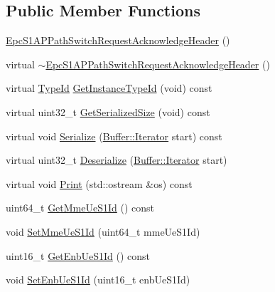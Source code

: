 \subsection*{Public Member Functions}
\begin{DoxyCompactItemize}
\item 
\hyperlink{classns3_1_1EpcS1APPathSwitchRequestAcknowledgeHeader_af9095af10fab4dd9b2f0b58a494218a7}{Epc\+S1\+A\+P\+Path\+Switch\+Request\+Acknowledge\+Header} ()
\item 
virtual \hyperlink{classns3_1_1EpcS1APPathSwitchRequestAcknowledgeHeader_a999083980082e33c430c78870f640fc5}{$\sim$\+Epc\+S1\+A\+P\+Path\+Switch\+Request\+Acknowledge\+Header} ()
\item 
virtual \hyperlink{classns3_1_1TypeId}{Type\+Id} \hyperlink{classns3_1_1EpcS1APPathSwitchRequestAcknowledgeHeader_ac08628e01af1b1cb1fd3edac460cb7f6}{Get\+Instance\+Type\+Id} (void) const 
\item 
virtual uint32\+\_\+t \hyperlink{classns3_1_1EpcS1APPathSwitchRequestAcknowledgeHeader_ab96242e4794a23c39d3cb900f0dbc7e2}{Get\+Serialized\+Size} (void) const 
\item 
virtual void \hyperlink{classns3_1_1EpcS1APPathSwitchRequestAcknowledgeHeader_a344ea304f7e59d655c3ac1a6fc713996}{Serialize} (\hyperlink{classns3_1_1Buffer_1_1Iterator}{Buffer\+::\+Iterator} start) const 
\item 
virtual uint32\+\_\+t \hyperlink{classns3_1_1EpcS1APPathSwitchRequestAcknowledgeHeader_ab487b927de1ce730d417cbc878b6ec6c}{Deserialize} (\hyperlink{classns3_1_1Buffer_1_1Iterator}{Buffer\+::\+Iterator} start)
\item 
virtual void \hyperlink{classns3_1_1EpcS1APPathSwitchRequestAcknowledgeHeader_a5f8068d2b492c5362358c6fe90c785c2}{Print} (std\+::ostream \&os) const 
\item 
uint64\+\_\+t \hyperlink{classns3_1_1EpcS1APPathSwitchRequestAcknowledgeHeader_a25244ccd02a3358f143380f89d98d6fe}{Get\+Mme\+Ue\+S1\+Id} () const 
\item 
void \hyperlink{classns3_1_1EpcS1APPathSwitchRequestAcknowledgeHeader_a0063bf29612cbb35ecb3fedfb4f53a6b}{Set\+Mme\+Ue\+S1\+Id} (uint64\+\_\+t mme\+Ue\+S1\+Id)
\item 
uint16\+\_\+t \hyperlink{classns3_1_1EpcS1APPathSwitchRequestAcknowledgeHeader_a2b428929f5758582a511b8ce8f011fe1}{Get\+Enb\+Ue\+S1\+Id} () const 
\item 
void \hyperlink{classns3_1_1EpcS1APPathSwitchRequestAcknowledgeHeader_a3d99cdb17b64856e1054911156a2612e}{Set\+Enb\+Ue\+S1\+Id} (uint16\+\_\+t enb\+Ue\+S1\+Id)

\end{DoxyCompactItemize}
